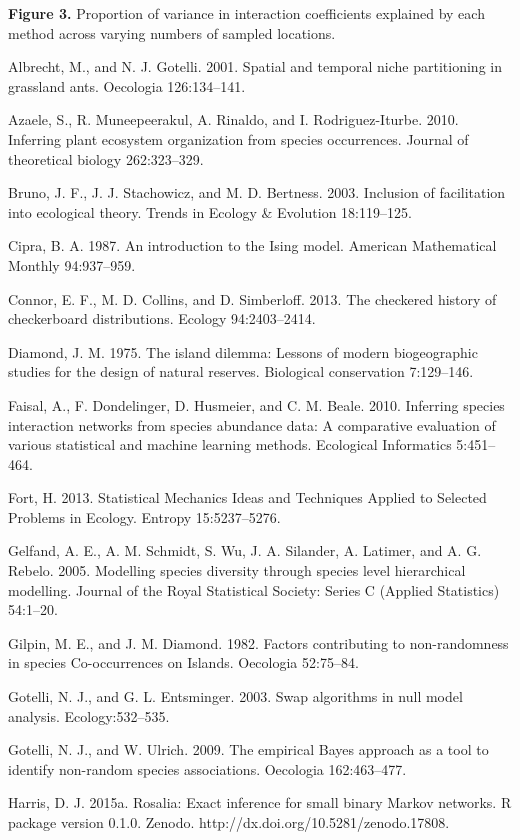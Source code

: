 \documentclass[12pt,]{article}
\begin{document}
\begin{spacing}{1.9}
\begin{flushleft}
\textbf{Figure 3.} Proportion of variance in interaction coefficients
explained by each method across varying numbers of sampled locations.

Albrecht, M., and N. J. Gotelli. 2001. Spatial and temporal niche
partitioning in grassland ants. Oecologia 126:134--141.

Azaele, S., R. Muneepeerakul, A. Rinaldo, and I. Rodriguez-Iturbe. 2010.
Inferring plant ecosystem organization from species occurrences. Journal
of theoretical biology 262:323--329.

Bruno, J. F., J. J. Stachowicz, and M. D. Bertness. 2003. Inclusion of
facilitation into ecological theory. Trends in Ecology \& Evolution
18:119--125.

Cipra, B. A. 1987. An introduction to the Ising model. American
Mathematical Monthly 94:937--959.

Connor, E. F., M. D. Collins, and D. Simberloff. 2013. The checkered
history of checkerboard distributions. Ecology 94:2403--2414.

Diamond, J. M. 1975. The island dilemma: Lessons of modern biogeographic
studies for the design of natural reserves. Biological conservation
7:129--146.

Faisal, A., F. Dondelinger, D. Husmeier, and C. M. Beale. 2010.
Inferring species interaction networks from species abundance data: A
comparative evaluation of various statistical and machine learning
methods. Ecological Informatics 5:451--464.

Fort, H. 2013. Statistical Mechanics Ideas and Techniques Applied to
Selected Problems in Ecology. Entropy 15:5237--5276.

Gelfand, A. E., A. M. Schmidt, S. Wu, J. A. Silander, A. Latimer, and A.
G. Rebelo. 2005. Modelling species diversity through species level
hierarchical modelling. Journal of the Royal Statistical Society: Series
C (Applied Statistics) 54:1--20.

Gilpin, M. E., and J. M. Diamond. 1982. Factors contributing to
non-randomness in species Co-occurrences on Islands. Oecologia
52:75--84.

Gotelli, N. J., and G. L. Entsminger. 2003. Swap algorithms in null
model analysis. Ecology:532--535.

Gotelli, N. J., and W. Ulrich. 2009. The empirical Bayes approach as a
tool to identify non-random species associations. Oecologia
162:463--477.

Harris, D. J. 2015a. Rosalia: Exact inference for small binary Markov
networks. R package version 0.1.0. Zenodo.
http://dx.doi.org/10.5281/zenodo.17808.


\end{flushleft}
\end{spacing}
\end{document}
